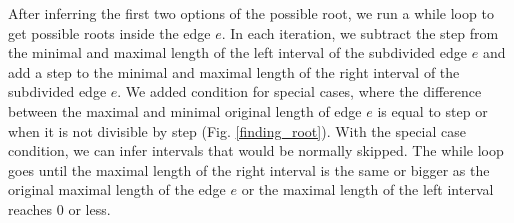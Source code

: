 After inferring the first two options of the possible root, we run a while loop to get possible roots inside the edge $e$. In each iteration, we subtract the step from the minimal and maximal length of the left interval of the subdivided edge $e$ and add a step to the minimal and maximal length of the right interval of the subdivided edge $e$. We added condition for special cases, where the difference between the maximal and minimal original length of edge $e$ is equal to step or when it is not divisible by step (Fig. \ref{finding_root}). With the special case condition, we can infer intervals that would be normally skipped. The while loop goes until the maximal length of the right interval is the same or bigger as the original maximal length of the edge $e$ or the maximal length of the left interval reaches $0$ or less.

